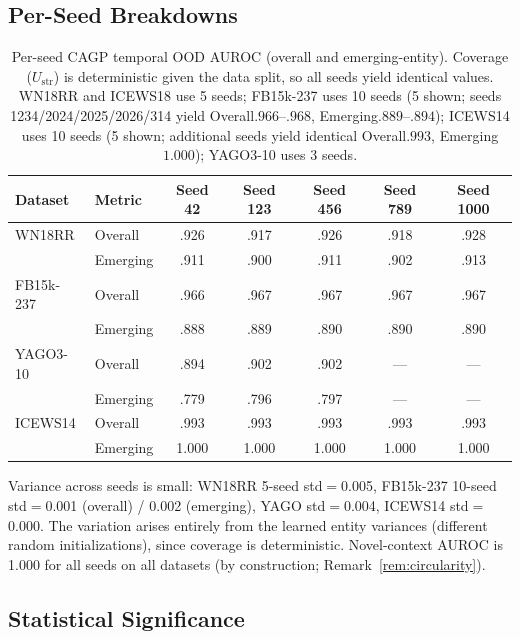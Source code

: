 \documentclass{article}
\begin{document}
\subsection{Per-Seed Breakdowns}
\label{app:per_seed}

\begin{table}[ht]
\centering
\caption{Per-seed CAGP temporal OOD AUROC (overall and emerging-entity). Coverage ($U_{\text{str}}$) is deterministic given the data split, so all seeds yield identical values. WN18RR and ICEWS18 use 5 seeds; FB15k-237 uses 10 seeds (5 shown; seeds 1234/2024/2025/2026/314 yield Overall$.966$--$.968$, Emerging$.889$--$.894$); ICEWS14 uses 10 seeds (5 shown; additional seeds yield identical Overall$.993$, Emerging$1.000$); YAGO3-10 uses 3 seeds.}
\small
\begin{tabular}{llccccc}
\toprule
Dataset & Metric & Seed 42 & Seed 123 & Seed 456 & Seed 789 & Seed 1000 \\
\midrule
WN18RR & Overall & .926 & .917 & .926 & .918 & .928 \\
       & Emerging & .911 & .900 & .911 & .902 & .913 \\
\midrule
FB15k-237 & Overall & .966 & .967 & .967 & .967 & .967 \\
          & Emerging & .888 & .889 & .890 & .890 & .890 \\
\midrule
YAGO3-10 & Overall & .894 & .902 & .902 & --- & --- \\
         & Emerging & .779 & .796 & .797 & --- & --- \\
\midrule
ICEWS14 & Overall & .993 & .993 & .993 & .993 & .993 \\
        & Emerging & 1.000 & 1.000 & 1.000 & 1.000 & 1.000 \\
\bottomrule
\end{tabular}
\end{table}

Variance across seeds is small: WN18RR 5-seed std$=$0.005, FB15k-237 10-seed std$=$0.001 (overall) / 0.002 (emerging), YAGO std$=$0.004, ICEWS14 std$=$0.000. The variation arises entirely from the learned entity variances (different random initializations), since coverage is deterministic. Novel-context AUROC is 1.000 for all seeds on all datasets (by construction; Remark~\ref{rem:circularity}).

\subsection{Statistical Significance}
\label{app:significance}
\end{document}
